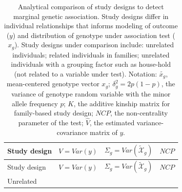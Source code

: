 \documentclass[]{book}
\begin{document}
\begin{longtable}[]{@{}llll@{}}
\caption{\label{tab:assoc-gen} Analytical comparison of study designs to
detect marginal genetic association. Study designs differ in individual
relationships that informs modeling of outcome (\(y\)) and distribution
of genotype under association test (\(x_g\)). Study designs under
comparison include: unrelated individuals; related individuals in
families; unrelated individuals with a grouping factor such as
house-hold (not related to a variable under test). Notation:
\(\tilde{x_g}\), mean-centered genotype vector \(x_g\);
\(\delta_g^2 = 2 p (1 - p)\), the variance of genotype random variable
with the minor allele frequency \(p\); \(K\), the additive kinship
matrix for family-based study design; \(NCP\), the non-centrality
parameter of the test; \(\hat{V}\), the estimated variance-covariance
matrix of \(y\).}\tabularnewline
\toprule
\begin{minipage}[b]{0.21\columnwidth}\raggedright\strut
Study design\strut
\end{minipage} & \begin{minipage}[b]{0.15\columnwidth}\raggedright\strut
\(V = Var(y)\)\strut
\end{minipage} & \begin{minipage}[b]{0.16\columnwidth}\raggedright\strut
\(\Sigma_g = Var(\mathcal{\tilde{X}}_g)\)\strut
\end{minipage} & \begin{minipage}[b]{0.37\columnwidth}\raggedright\strut
\(NCP\)\strut
\end{minipage}\tabularnewline
\midrule
\endfirsthead
\toprule
\begin{minipage}[b]{0.21\columnwidth}\raggedright\strut
Study design\strut
\end{minipage} & \begin{minipage}[b]{0.15\columnwidth}\raggedright\strut
\(V = Var(y)\)\strut
\end{minipage} & \begin{minipage}[b]{0.16\columnwidth}\raggedright\strut
\(\Sigma_g = Var(\mathcal{\tilde{X}}_g)\)\strut
\end{minipage} & \begin{minipage}[b]{0.37\columnwidth}\raggedright\strut
\(NCP\)\strut
\end{minipage}\tabularnewline
\midrule
\endhead
\begin{minipage}[t]{0.21\columnwidth}\raggedright\strut
Unrelated\strut
\end{minipage} & \begin{minipage}[t]{0.15\columnwidth}\raggedright\strut

\end{minipage}
\end{longtable}
\end{document}
